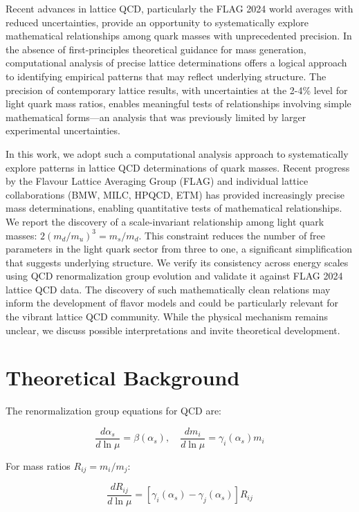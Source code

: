\documentclass[12pt]{article}
\begin{document}
Recent advances in lattice QCD, particularly the FLAG 2024 world averages with reduced uncertainties, provide an opportunity to systematically explore mathematical relationships among quark masses with unprecedented precision. In the absence of first-principles theoretical guidance for mass generation, computational analysis of precise lattice determinations offers a logical approach to identifying empirical patterns that may reflect underlying structure. The precision of contemporary lattice results, with uncertainties at the 2-4\% level for light quark mass ratios, enables meaningful tests of relationships involving simple mathematical forms—an analysis that was previously limited by larger experimental uncertainties.

In this work, we adopt such a computational analysis approach to systematically explore patterns in lattice QCD determinations of quark masses. Recent progress by the Flavour Lattice Averaging Group (FLAG) and individual lattice collaborations (BMW, MILC, HPQCD, ETM) has provided increasingly precise mass determinations, enabling quantitative tests of mathematical relationships. We report the discovery of a scale-invariant relationship among light quark masses: $2(m_d/m_u)^3 = m_s/m_d$. This constraint reduces the number of free parameters in the light quark sector from three to one, a significant simplification that suggests underlying structure. We verify its consistency across energy scales using QCD renormalization group evolution and validate it against FLAG 2024 lattice QCD data. The discovery of such mathematically clean relations may inform the development of flavor models and could be particularly relevant for the vibrant lattice QCD community. While the physical mechanism remains unclear, we discuss possible interpretations and invite theoretical development.

\section{Theoretical Background}

The renormalization group equations for QCD are:

\begin{equation}
\frac{d\alpha_s}{d\ln\mu} = \beta(\alpha_s),\quad \frac{dm_i}{d\ln\mu} = \gamma_i(\alpha_s)m_i
\end{equation}

For mass ratios $R_{ij} = m_i/m_j$:

\begin{equation}
\frac{dR_{ij}}{d\ln\mu} = [\gamma_i(\alpha_s) - \gamma_j(\alpha_s)]R_{ij}
\end{equation}
\end{document}
